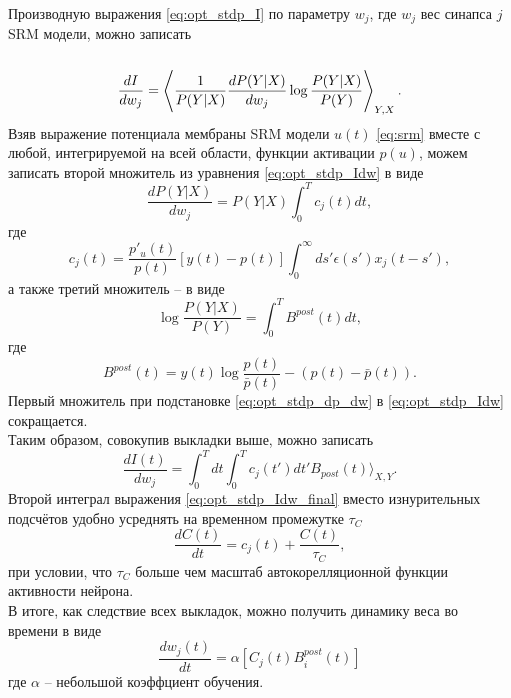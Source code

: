 \documentclass[a4paper,10pt]{article}
\def\la{\left\langle\rule{0pt}{3em}}
\def\ra{\right\rangle}
\begin{document}
\indent Производную выражения \eqref{eq:opt_stdp_I} по параметру $w_{j}$, где $w_{j}$ вес синапса $j$ SRM модели, можно записать
\begin{equation}\label{eq:opt_stdp_Idw}
\frac{dI}{dw_j} = \la \frac{1}{P(Y|X)}\frac{dP(Y|X)}{dw_{j}}\log\frac{P(Y|X)}{P(Y)} \ra_{Y,X}.
\end{equation} 
Взяв выражение потенциала мембраны SRM модели $u(t)$ \eqref{eq:srm} вместе с любой, интегрируемой на всей области, функции активации $p(u)$, можем записать второй множитель из уравнения \eqref{eq:opt_stdp_Idw} в виде
\begin{equation}\label{eq:opt_stdp_dp_dw}
\frac{dP(Y|X)}{dw_{j}} = P(Y|X)\int_{0}^{T} c_{j}(t)dt,
\end{equation} 
где
\begin{equation*}
c_{j}(t) = \frac{p'_{u}(t)}{p(t)}[y(t)-p(t)]\int_{0}^{\infty}ds'\epsilon(s') x_{j}(t-s'),
\end{equation*} 
а также третий множитель -- в виде
\begin{equation*}
\log\frac{P(Y|X)}{P(Y)} = \int_{0}^{T}B^{post}(t)dt,
\end{equation*}
где
\begin{equation*}
B^{post}(t) = y(t)\log \frac{p(t)}{\bar{p}(t)} - (p(t)-\bar{p}(t)).
\end{equation*} 
Первый множитель при подстановке \eqref{eq:opt_stdp_dp_dw} в \eqref{eq:opt_stdp_Idw} сокращается.\\
\indent Таким образом, совокупив выкладки выше, можно записать\\
\begin{equation}\label{eq:opt_stdp_Idw_final}
\frac{dI(t)}{dw_j} = \int_{0}^{T} dt \int_{0}^{T} c_{j}(t')dt' B_{post}(t) \rangle _{X,Y}.
\end{equation}
\indent Второй интеграл выражения \eqref{eq:opt_stdp_Idw_final} вместо изнурительных подсчётов удобно усреднять на временном промежутке $\tau_{C}$ 
\begin{equation*}
\frac{dC(t)}{dt} = c_{j}(t) + \frac{C(t)}{\tau_{C}},
\end{equation*}
при условии, что $\tau_{C}$ больше чем масштаб автокорелляционной функции активности нейрона.\\
\indent В итоге, как следствие всех выкладок, можно получить динамику веса во времени в виде
\begin{equation}\label{eq:opt_stdp_dw_dt}
\frac{dw_{j}(t)}{dt} = \alpha[C_{j}(t)B^{post}_{i}(t)]
\end{equation}
где $\alpha$ -- небольшой коэффциент обучения.\\
\end{document}
